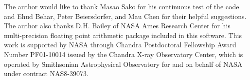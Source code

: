 \documentclass[preprint, floatfix, pra, showpacs, showkeys]{revtex4}
\begin{document}
\begin{acknowledgments}
The author would like to thank Masao Sako for his continuous test of the code
and Ehud Behar, Peter Beiersdorfer, and Mau Chen for their helpful
suggestions. The author also thanks D.H. Bailey 
of NASA Ames Research Center for his multi-precision floating point arithmetic
package included in this software. This work is supported by
NASA through Chandra Postdoctoral Fellowship Award Number PF01-10014 issued by
the Chandra X-ray Observatory Center, which is operated by Smithsonian
Astrophysical Observatory for and on behalf of NASA under contract NAS8-39073.
\end{acknowledgments}



\end{document}
